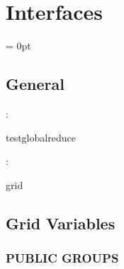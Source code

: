 
\section{Interfaces} 


\parskip = 0pt

\vspace{3mm} \subsection*{General}

: 

testglobalreduce
\vspace{2mm}

: 

grid
\vspace{2mm}
\subsection*{Grid Variables}
\vspace{5mm}\subsubsection{PUBLIC GROUPS}

\vspace{5mm}

